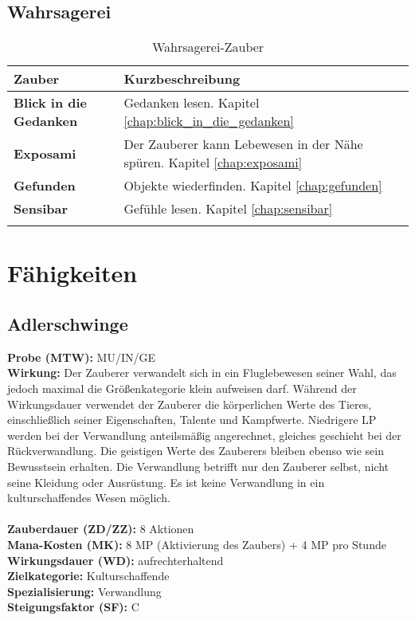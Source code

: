 \subsection{Wahrsagerei}
\begin{longtable}{|p{5cm}|p{10cm}|}
\hline
\textbf{Zauber} & \textbf{Kurzbeschreibung} \\ \hline

\textbf{Blick in die Gedanken} & Gedanken lesen. Kapitel \ref{chap:blick_in_die_gedanken} \\ \hline

\textbf{Exposami} & Der Zauberer kann Lebewesen in der Nähe spüren. Kapitel \ref{chap:exposami} \\ \hline

\textbf{Gefunden} & Objekte wiederfinden. Kapitel \ref{chap:gefunden} \\ \hline

\textbf{Sensibar} & Gefühle lesen. Kapitel \ref{chap:sensibar} \\ \hline

\caption{Wahrsagerei-Zauber}
\label{tab:wahrsagerei-zauber}
\end{longtable}


\section{Fähigkeiten}

\subsection{Adlerschwinge}
\label{chap:adlerschwinge}
\textbf{Probe (MTW):} MU/IN/GE \\
\textbf{Wirkung:} Der Zauberer verwandelt sich in ein Fluglebewesen seiner Wahl, das jedoch maximal die Größenkategorie klein aufweisen darf. Während der Wirkungsdauer verwendet der Zauberer die körperlichen Werte des Tieres, einschließlich seiner Eigenschaften, Talente und Kampfwerte. Niedrigere LP werden bei der Verwandlung anteilsmäßig angerechnet, gleiches geschieht bei der Rückverwandlung. Die geistigen Werte des Zauberers bleiben ebenso wie sein Bewusstsein erhalten. Die Verwandlung betrifft nur den Zauberer selbst, nicht seine Kleidung oder Ausrüstung. Es ist keine Verwandlung in ein kulturschaffendes Wesen möglich.\\
 \\
\textbf{Zauberdauer (ZD/ZZ):} 8 Aktionen \\
\textbf{Mana-Kosten (MK):} 8 MP (Aktivierung des Zaubers) + 4 MP pro Stunde \\
\textbf{Wirkungsdauer (WD):} aufrechterhaltend \\
\textbf{Zielkategorie:} Kulturschaffende \\
\textbf{Spezialisierung:} Verwandlung \\
\textbf{Steigungsfaktor (SF):} C


